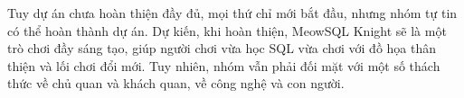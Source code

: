 Tuy dự án chưa hoàn thiện đầy đủ, mọi thứ chỉ mới bắt đầu, nhưng nhóm tự tin có thể hoàn thành dự án. Dự kiến, khi hoàn thiện, MeowSQL Knight sẽ là một trò chơi đầy sáng tạo, giúp người chơi vừa học SQL vừa chơi với đồ họa thân thiện và lối chơi đổi mới. Tuy nhiên, nhóm vẫn phải đối mặt với một số thách thức về chủ quan và khách quan, về công nghệ và con người.

\clearpage
{}
